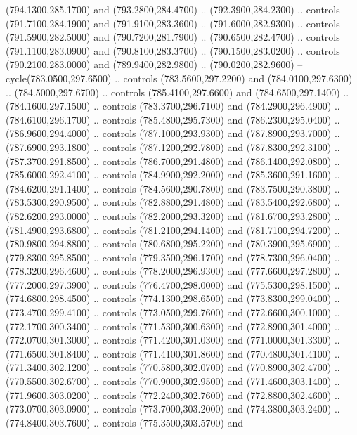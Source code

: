 {\begin{scope}[y=0.80pt, x=0.80pt, yscale=-1, xscale=1, inner sep=0pt, outer sep=0pt, #1]
      (794.1300,285.1700) and (793.2800,284.4700) .. (792.3900,284.2300) .. controls
      (791.7100,284.1900) and (791.9100,283.3600) .. (791.6000,282.9300) .. controls
      (791.5900,282.5000) and (790.7200,281.7900) .. (790.6500,282.4700) .. controls
      (791.1100,283.0900) and (790.8100,283.3700) .. (790.1500,283.0200) .. controls
      (790.2100,283.0000) and (789.9400,282.9800) .. (790.0200,282.9600) --
      cycle(783.0500,297.6500) .. controls (783.5600,297.2200) and
      (784.0100,297.6300) .. (784.5000,297.6700) .. controls (785.4100,297.6600) and
      (784.6500,297.1400) .. (784.1600,297.1500) .. controls (783.3700,296.7100) and
      (784.2900,296.4900) .. (784.6100,296.1700) .. controls (785.4800,295.7300) and
      (786.2300,295.0400) .. (786.9600,294.4000) .. controls (787.1000,293.9300) and
      (787.8900,293.7000) .. (787.6900,293.1800) .. controls (787.1200,292.7800) and
      (787.8300,292.3100) .. (787.3700,291.8500) .. controls (786.7000,291.4800) and
      (786.1400,292.0800) .. (785.6000,292.4100) .. controls (784.9900,292.2000) and
      (785.3600,291.1600) .. (784.6200,291.1400) .. controls (784.5600,290.7800) and
      (783.7500,290.3800) .. (783.5300,290.9500) .. controls (782.8800,291.4800) and
      (783.5400,292.6800) .. (782.6200,293.0000) .. controls (782.2000,293.3200) and
      (781.6700,293.2800) .. (781.4900,293.6800) .. controls (781.2100,294.1400) and
      (781.7100,294.7200) .. (780.9800,294.8800) .. controls (780.6800,295.2200) and
      (780.3900,295.6900) .. (779.8300,295.8500) .. controls (779.3500,296.1700) and
      (778.7300,296.0400) .. (778.3200,296.4600) .. controls (778.2000,296.9300) and
      (777.6600,297.2800) .. (777.2000,297.3900) .. controls (776.4700,298.0000) and
      (775.5300,298.1500) .. (774.6800,298.4500) .. controls (774.1300,298.6500) and
      (773.8300,299.0400) .. (773.4700,299.4100) .. controls (773.0500,299.7600) and
      (772.6600,300.1000) .. (772.1700,300.3400) .. controls (771.5300,300.6300) and
      (772.8900,301.4000) .. (772.0700,301.3000) .. controls (771.4200,301.0300) and
      (771.0000,301.3300) .. (771.6500,301.8400) .. controls (771.4100,301.8600) and
      (770.4800,301.4100) .. (771.3400,302.1200) .. controls (770.5800,302.0700) and
      (770.8900,302.4700) .. (770.5500,302.6700) .. controls (770.9000,302.9500) and
      (771.4600,303.1400) .. (771.9600,303.0200) .. controls (772.2400,302.7600) and
      (772.8800,302.4600) .. (773.0700,303.0900) .. controls (773.7000,303.2000) and
      (774.3800,303.2400) .. (774.8400,303.7600) .. controls (775.3500,303.5700) and

\end{scope}}

